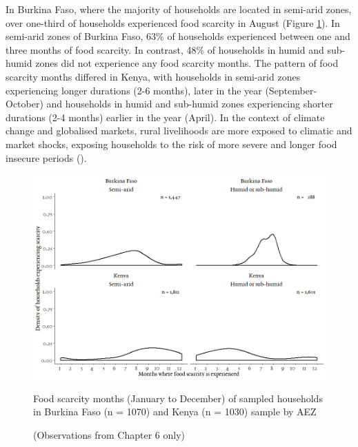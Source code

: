 In Burkina Faso, where the majority of households are located in semi-arid zones, over one-third of households experienced food scarcity in August (Figure \ref{fig:07_4}). In semi-arid zones of Burkina Faso, 63\% of households experienced between one and three months of food scarcity. In contrast, 48\% of households in humid and sub-humid zones did not experience any food scarcity months. The pattern of food scarcity months differed in Kenya, with households in semi-arid zones experiencing longer durations (2-6 months), later in the year (September-October) and households in humid and sub-humid zones experiencing shorter durations (2-4 months) earlier in the year (April). In the context of climate change and globalised markets, rural livelihoods are more exposed to climatic and market shocks, exposing households to the risk of more severe and longer food insecure periods (\citealp{Fanzo2018}).


\begin{figure}[H]
  \includegraphics[width=1\textwidth]{figs_07/ScarceMonths_2.png}
  \captionsetup{singlelinecheck = false, justification=justified} %
  \caption{Food scarcity months (January to December) of sampled households in Burkina Faso (n = 1070) and Kenya (n = 1030) sample by AEZ}
  \label{fig:07_4}
  \vspace*{-3mm}
 	\caption*{(Observations from Chapter 6 only)}
\end{figure}

